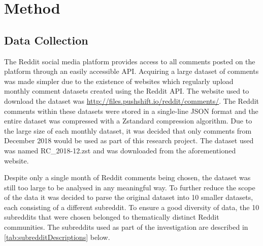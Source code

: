\chapter{Method}\label{ch:Method}

\section{Data Collection}

The Reddit social media platform provides access to all comments posted on the platform through an easily accessible API. Acquiring a large dataset of comments was made simpler due to the existence of websites which regularly upload monthly comment datasets created using the Reddit API. The website used to download the dataset was \url{http://files.pushshift.io/reddit/comments/}. The Reddit comments within these datasets were stored in a single-line JSON format and the entire dataset was compressed with a Zstandard compression algorithm. Due to the large size of each monthly dataset, it was decided that only comments from December 2018 would be used as part of this research project. The dataset used was named RC\_2018-12.zst and was downloaded from the aforementioned website.

Despite only a single month of Reddit comments being chosen, the dataset was still too large to be analysed in any meaningful way. To further reduce the scope of the data it was decided to parse the original dataset into 10 smaller datasets, each consisting of a different subreddit. To ensure a good diversity of data, the 10 subreddits that were chosen belonged to thematically distinct Reddit communities. The subreddits used as part of the investigation are described in \autoref{tab:subredditDescriptions} below.

